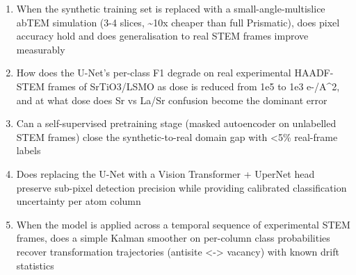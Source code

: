 \documentclass[11pt]{article}
\begin{document}
\begin{enumerate}[leftmargin=1.6em,itemsep=0.2em,topsep=0.2em,label=Q\arabic*.]
\item When the synthetic training set is replaced with a small-angle-multislice abTEM simulation (3-4 slices, \textasciitilde{}10x cheaper than full Prismatic), does pixel accuracy hold and does generalisation to real STEM frames improve measurably
\item How does the U-Net's per-class F1 degrade on real experimental HAADF-STEM frames of SrTiO3/LSMO as dose is reduced from 1e5 to 1e3 e-/A\textasciicircum{}2, and at what dose does Sr vs La/Sr confusion become the dominant error
\item Can a self-supervised pretraining stage (masked autoencoder on unlabelled STEM frames) close the synthetic-to-real domain gap with \textless{}5\% real-frame labels
\item Does replacing the U-Net with a Vision Transformer + UperNet head preserve sub-pixel detection precision while providing calibrated classification uncertainty per atom column
\item When the model is applied across a temporal sequence of experimental STEM frames, does a simple Kalman smoother on per-column class probabilities recover transformation trajectories (antisite \textless{}-\textgreater{} vacancy) with known drift statistics
\end{enumerate}
\end{document}
